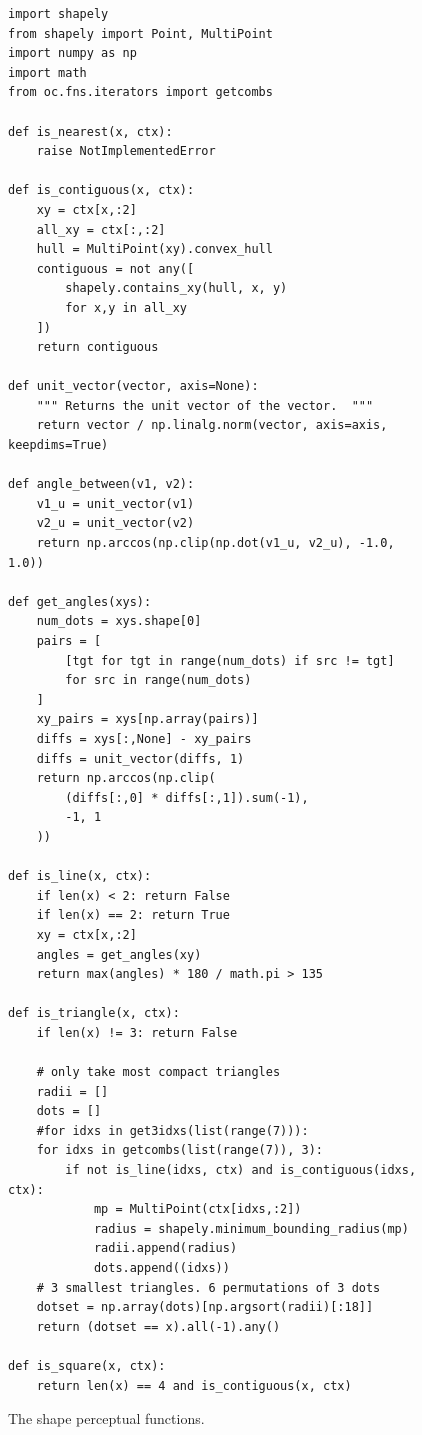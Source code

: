 \documentclass[11pt]{article}
\begin{document}
\begin{figure}
\begin{lstlisting}
import shapely
from shapely import Point, MultiPoint
import numpy as np
import math
from oc.fns.iterators import getcombs

def is_nearest(x, ctx):
    raise NotImplementedError

def is_contiguous(x, ctx):
    xy = ctx[x,:2]
    all_xy = ctx[:,:2]
    hull = MultiPoint(xy).convex_hull
    contiguous = not any([
        shapely.contains_xy(hull, x, y)
        for x,y in all_xy
    ])
    return contiguous

def unit_vector(vector, axis=None):
    """ Returns the unit vector of the vector.  """
    return vector / np.linalg.norm(vector, axis=axis, keepdims=True)

def angle_between(v1, v2):
    v1_u = unit_vector(v1)
    v2_u = unit_vector(v2)
    return np.arccos(np.clip(np.dot(v1_u, v2_u), -1.0, 1.0))

def get_angles(xys):
    num_dots = xys.shape[0]
    pairs = [
        [tgt for tgt in range(num_dots) if src != tgt]
        for src in range(num_dots)
    ]
    xy_pairs = xys[np.array(pairs)]
    diffs = xys[:,None] - xy_pairs
    diffs = unit_vector(diffs, 1)
    return np.arccos(np.clip(
        (diffs[:,0] * diffs[:,1]).sum(-1),
        -1, 1
    ))

def is_line(x, ctx):
    if len(x) < 2: return False
    if len(x) == 2: return True
    xy = ctx[x,:2]
    angles = get_angles(xy)
    return max(angles) * 180 / math.pi > 135

def is_triangle(x, ctx):
    if len(x) != 3: return False

    # only take most compact triangles
    radii = []
    dots = []
    #for idxs in get3idxs(list(range(7))):
    for idxs in getcombs(list(range(7)), 3):
        if not is_line(idxs, ctx) and is_contiguous(idxs, ctx):
            mp = MultiPoint(ctx[idxs,:2])
            radius = shapely.minimum_bounding_radius(mp)
            radii.append(radius)
            dots.append((idxs))
    # 3 smallest triangles. 6 permutations of 3 dots
    dotset = np.array(dots)[np.argsort(radii)[:18]]
    return (dotset == x).all(-1).any()

def is_square(x, ctx):
    return len(x) == 4 and is_contiguous(x, ctx)
\end{lstlisting}
\caption{The shape perceptual functions.}
\label{fig:shape}
\end{figure}
\end{document}
